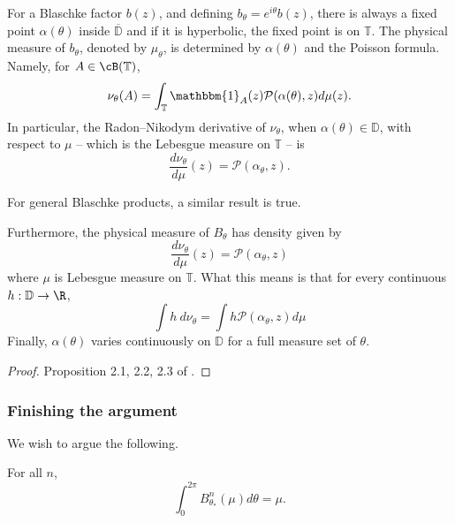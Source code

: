 \documentclass[10pt]{amsart}
\numberwithin{equation}{section}     %
\newcommand{\T}{\mathbb{T}}
\newcommand{\cP}{\mathcal{P}}\newcommand{\cQ}{\mathcal{Q}}\newcommand{\cR}{\mathcal{R}}
\newcommand{\D}{\mathbb{D}}
\begin{document}
For a Blaschke factor $b(z)$, and defining $b_\theta = e^{i\theta} b(z)$, there is always a fixed point $\alpha(\theta)$ inside $\overline{\D}$ and if it is hyperbolic, the fixed point is on $\T$. The physical measure of $b_\theta$, denoted by $\mu_\theta$, is determined by $\alpha(\theta)$ and the Poisson formula. Namely, for $A \in \cB(\T)$, $$\nu_\theta(A) = \int_\T \mathbbm{1}_A(z) \cP(\alpha(\theta), z) d\mu(z).$$ In particular, the Radon--Nikodym derivative of $\nu_\theta$, when $\alpha(\theta) \in \D$, with respect to $\mu$ -- which is the Lebesgue measure on $\T$ -- is $$\frac{d\nu_\theta}{d\mu}(z) = \cP(\alpha_\theta,z).$$ 

For general Blaschke products, a similar result is true. 

\begin{proposition}
  Furthermore, the physical measure of $B_\theta$ has density given by $$\frac{d \nu_\theta}{d\mu}(z) = \cP(\alpha_\theta,z)$$ where $\mu$ is Lebesgue measure on $\T$. What this means is that for every continuous $h:\D \to \R$, $$\int h \ d\nu_\theta = \int h \cP(\alpha_\theta,z) d\mu $$ Finally, $\alpha(\theta)$ varies continuously on $\D$ for a full measure set of $\theta.$
\end{proposition}

\begin{proof}
    Proposition 2.1, 2.2, 2.3 of \cite{pujals2006expanding}. 
\end{proof}

\subsubsection{Finishing the argument}

We wish to argue the following. 

\begin{proposition}
    For all $n$,  $$\int_0^{2\pi} B^n_{\theta_*}(\mu) d\theta = \mu.$$
\end{proposition}
\end{document}
